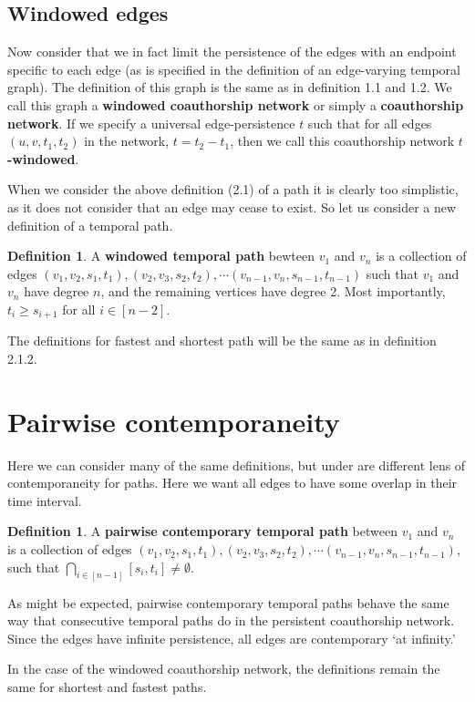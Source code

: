 \documentclass{article}
\theoremstyle{definition}
\newtheorem{defn}[thm]{Definition}
\numberwithin{thm}{subsection}
\begin{document}
\subsection{Windowed edges}

Now consider that we in fact limit the persistence of the edges with an endpoint
specific to each edge (as is specified in the definition of an edge-varying
temporal graph). The definition of this graph is the same as in definition 1.1
and 1.2. We call this graph a \textbf{windowed coauthorship network} or simply
a \textbf{coauthorship network}. If we specify a universal edge-persistence $t$
such that for all edges $(u,v,t_1,t_2)$ in the network, $t = t_2 - t_1$, then
we call this coauthorship network \textbf{$t$-windowed}.

When we consider the above definition (2.1) of a path it is clearly too
simplistic, as it does not consider that an edge may cease to exist. So let
us consider a new definition of a temporal path.

\begin{defn}
  A \textbf{windowed temporal path} bewteen $v_1$ and $v_n$ is a collection of
  edges $(v_1,v_2,s_1,t_1),(v_2,v_3,s_2,t_2), \cdots (v_{n-1},v_{n}, s_{n-1}, t_{n-1})$
  such that $v_1$ and $v_n$ have degree $n$, and the remaining vertices have
  degree 2.  Most importantly, $t_i \geq s_{i+1}$ for all $i \in [n-2]$.
\end{defn}

The definitions for fastest and shortest path will be the same as in definition
2.1.2.


\section{Pairwise contemporaneity}

Here we can consider many of the same definitions, but under are different
lens of contemporaneity for paths. Here we want all edges to have some overlap
in their time interval.

\begin{defn}
  A \textbf{pairwise contemporary temporal path} between $v_1$ and $v_n$ is a
  collection of edges $(v_1,v_2,s_1,t_1), (v_2,v_3,s_2,t_2), \cdots (v_{n-1},v_n,s_{n-1}, t_{n-1})$, such that $\bigcap_{i \in [n-1]} [s_i, t_i] \neq \emptyset$.
\end{defn}

As might be expected, pairwise contemporary temporal paths behave the same way
that consecutive temporal paths do in the persistent coauthorship network.
Since the edges have infinite persistence, all edges are contemporary `at
infinity.'

In the case of the windowed coauthorship network, the definitions remain the same
for shortest and fastest paths.
\end{document}
